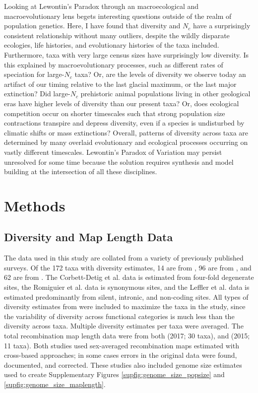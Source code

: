 \documentclass[11pt]{article}
\begin{document}
Looking at Lewontin's Paradox through an macroecological and macroevolutionary
lens begets interesting questions outside of the realm of population genetics.
Here, I have found that diversity and $N_c$ have a surprisingly consistent
relationship without many outliers, despite the wildly disparate ecologies,
life histories, and evolutionary histories of the taxa included. Furthermore,
taxa with very large census sizes have surprisingly low diversity. Is this
explained by macroevolutionary processes, such as different rates of speciation
for large-$N_c$ taxa? Or, are the levels of diversity we observe today an
artifact of our timing relative to the last glacial maximum, or the last major
extinction? Did large-$N_c$ prehistoric animal populations living in other
geological eras have higher levels of diversity than our present taxa? Or, does
ecological competition occur on shorter timescales such that strong population
size contractions transpire and depress diversity, even if a species is
undisturbed by climatic shifts or mass extinctions? Overall, patterns of
diversity across taxa are determined by many overlaid evolutionary and
ecological processes occurring on vastly different timescales. Lewontin's
Paradox of Variation may persist unresolved for some time because the solution
requires synthesis and model building at the intersection of all these
disciplines.


\section*{Methods}

\subsection*{Diversity and Map Length Data}
\label{sec:methods-diversity}

The data used in this study are collated from a variety of previously published
surveys. Of the 172 taxa with diversity estimates, 14 are from
\textcite{Corbett-Detig2015-gt}, 96 are from \textcite{Leffler2012-zj}, and 62
are from \textcite{Romiguier2014-bp}. The Corbett-Detig et al. data is
estimated from four-fold degenerate sites, the Romiguier et al. data is
synonymous sites, and the Leffler et al. data is estimated predominantly from
silent, intronic, and non-coding sites. All types of diversity estimates from
\textcite{Leffler2012-zj} were included to maximize the taxa in the study,
since the variability of diversity across functional categories is much less
than the diversity across taxa. Multiple diversity estimates per taxa were
averaged. The total recombination map length data were from both
\citeauthor{Stapley2017-fs} (2017; 30 taxa), and
\citeauthor{Corbett-Detig2015-gt} (2015; 11 taxa). Both studies used
sex-averaged recombination maps estimated with cross-based approaches; in some
cases errors in the original data were found, documented, and corrected. These
studies also included genome size estimates used to create Supplementary
Figures \ref{supfig:genome_size_popsize} and
\ref{supfig:genome_size_maplength}. 
\end{document}
